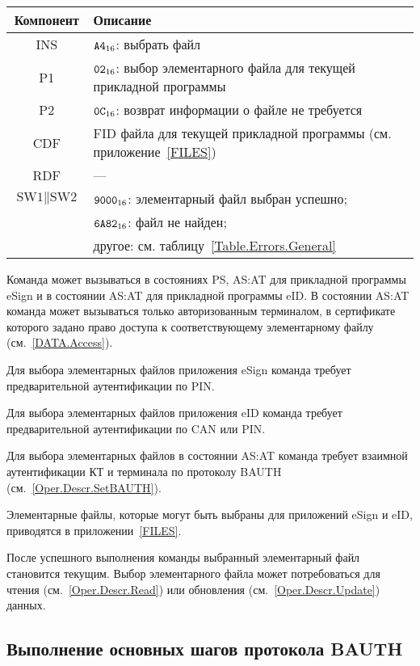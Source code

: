 \begin{table}[hbt]
\caption{}\label{Table.Oper.SelectEFCmd}
\begin{tabular}{|c|p{14cm}|}
\hline
Компонент & Описание \\
\hline
\hline
INS & $\texttt{A4}_{16}$: выбрать файл\\ 
\hline
P1 & $\texttt{02}_{16}$: выбор элементарного файла для текущей прикладной программы\\
\hline
P2 & $\texttt{0C}_{16}$: возврат информации о файле не требуется \\
\hline
CDF & FID файла для текущей прикладной программы (см. приложение~\ref{FILES})\\
\hline 
RDF &  --- \\
\hline
$\text{SW1}\parallel\text{SW2}$ & 
$\texttt{9000}_{16}$: элементарный файл выбран успешно; \\
  & $\texttt{6A82}_{16}$: файл не найден; \\
  & другое: см. таблицу~\ref{Table.Errors.General}\\
\hline
\end{tabular}
\end{table}

Команда может вызываться в состояниях PS, AS:AT 
для прикладной программы eSign и в состоянии 
AS:AT для прикладной программы eID.
В состоянии AS:AT команда может вызываться только 
авторизованным терминалом, в сертификате которого
задано право доступа к соответствующему элементарному файлу (см.~\ref{DATA.Access}).

Для выбора элементарных файлов приложения eSign команда требует 
предварительной аутентификации по PIN.

Для выбора элементарных файлов приложения eID команда требует 
предварительной аутентификации по CAN или PIN.

Для выбора элементарных файлов в состоянии AS:AT
команда требует взаимной аутентификации КТ и терминала
по протоколу BAUTH (см.~\ref{Oper.Descr.SetBAUTH}).

Элементарные файлы, которые могут быть выбраны 
для приложений eSign и eID, приводятся в приложении~\ref{FILES}. 

После успешного выполнения команды выбранный элементарный файл
становится текущим.
Выбор элементарного файла может потребоваться для
чтения (см.~\ref{Oper.Descr.Read}) или 
обновления (см.~\ref{Oper.Descr.Update}) данных.

\subsection{Выполнение основных шагов протокола BAUTH}
\label{Oper.Descr.GABAUTH} 

